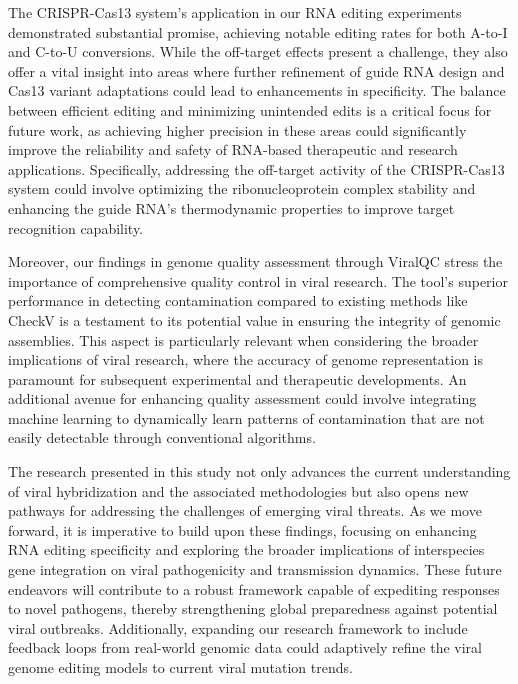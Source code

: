 \documentclass{article}
\begin{document}
The CRISPR-Cas13 system's application in our RNA editing experiments demonstrated substantial promise, achieving notable editing rates for both A-to-I and C-to-U conversions. While the off-target effects present a challenge, they also offer a vital insight into areas where further refinement of guide RNA design and Cas13 variant adaptations could lead to enhancements in specificity. The balance between efficient editing and minimizing unintended edits is a critical focus for future work, as achieving higher precision in these areas could significantly improve the reliability and safety of RNA-based therapeutic and research applications. Specifically, addressing the off-target activity of the CRISPR-Cas13 system could involve optimizing the ribonucleoprotein complex stability and enhancing the guide RNA's thermodynamic properties to improve target recognition capability.

Moreover, our findings in genome quality assessment through ViralQC stress the importance of comprehensive quality control in viral research. The tool's superior performance in detecting contamination compared to existing methods like CheckV is a testament to its potential value in ensuring the integrity of genomic assemblies. This aspect is particularly relevant when considering the broader implications of viral research, where the accuracy of genome representation is paramount for subsequent experimental and therapeutic developments. An additional avenue for enhancing quality assessment could involve integrating machine learning to dynamically learn patterns of contamination that are not easily detectable through conventional algorithms.

The research presented in this study not only advances the current understanding of viral hybridization and the associated methodologies but also opens new pathways for addressing the challenges of emerging viral threats. As we move forward, it is imperative to build upon these findings, focusing on enhancing RNA editing specificity and exploring the broader implications of interspecies gene integration on viral pathogenicity and transmission dynamics. These future endeavors will contribute to a robust framework capable of expediting responses to novel pathogens, thereby strengthening global preparedness against potential viral outbreaks. Additionally, expanding our research framework to include feedback loops from real-world genomic data could adaptively refine the viral genome editing models to current viral mutation trends.
\end{document}
